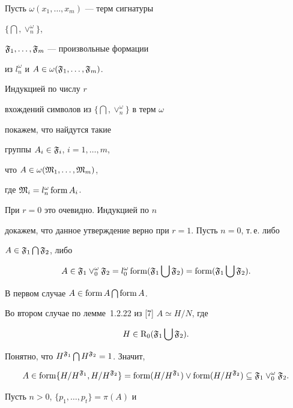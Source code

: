\begin{pf}


Пусть $\omega (x_1,\dotsc, x_m)$ --- терм сигнатуры


$\{\bigcap,\vee_n^{\omega}\}$,


$\frak{F}_1,\dotsc,\frak{F}_m$ --- произвольные формации


из $l^{\omega}_n$ и $A\in\omega (\frak{F}_1,\dotsc,\frak{F}_m)$.


Индукцией по числу $r$


вхождений символов из $\{\bigcap,\vee_n^{\omega}\}$ в терм $\omega$


покажем, что найдутся такие


группы $A_i\in\frak{F}_i$, $i=1,\dotsc,m$,


что $A\in\omega (\frak{M}_1,\dotsc,\frak{M}_m)$,


где $\frak{M}_i=l^{\omega}_n\operatorname{form} A_i$.


При $r=0$ это очевидно. Индукцией по $n$


докажем, что данное утверждение верно при $r=1$. Пусть $n=0$, т.\,е. либо


$A\in\frak{F}_1\bigcap\frak{F}_2$, либо


$$


A\in\frak{F}_1\vee^{\omega}_0\frak{F}_2=


l^{\omega}_0\form (\frak{F}_1\bigcup\frak{F}_2)=


\form (\frak{F}_1\bigcup\frak{F}_2).


$$


В первом случае $A\in\operatorname{form} A\bigcap\operatorname{form} A$.


Во втором случае по лемме~1.2.22 из [7] $A\simeq H/N$, где


$$


H\in {\mathrm R}_0(\frak{F}_1\bigcup\frak{F}_2).


$$


Понятно, что $H^{\frak{F}_1}\bigcap H^{\frak{F}_2}=1$. Значит,


$$


A\in\form \{H/H^{\frak{F}_1},H/H^{\frak{F}_2}\}=


\form (H/H^{\frak{F}_1})\vee


\form (H/H^{\frak{F}_2})\subseteq\frak{F}_1\vee^{\omega}_0\frak{F}_2.


$$





Пусть $n>0$, $\{p_1,\dotsc,p_t\}=\pi (A)$ и



\end{pf}
